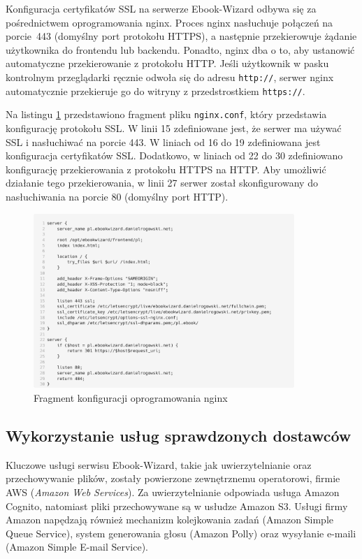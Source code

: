 Konfiguracja certyfikatów SSL na serwerze Ebook-Wizard odbywa się za pośrednictwem oprogramowania nginx. Proces nginx nasłuchuje połączeń na porcie~443 (domyślny port protokołu HTTPS), a następnie przekierowuje żądanie użytkownika do frontendu lub backendu. Ponadto, nginx dba o to, aby ustanowić automatyczne przekierowanie z protokołu HTTP. Jeśli użytkownik w pasku kontrolnym przeglądarki ręcznie odwoła się do adresu \verb|http://|, serwer nginx automatycznie przekieruje go do witryny z przedstrostkiem \verb|https://|.

Na listingu \ref{listing:carbon_nginx} przedstawiono fragment pliku \verb|nginx.conf|, który przedstawia konfigurację protokołu SSL. W linii 15 zdefiniowane jest, że serwer ma używać SSL i nasłuchiwać na porcie 443. W liniach od 16 do 19 zdefiniowana jest konfiguracja certyfikatów SSL. Dodatkowo, w liniach od 22 do 30 zdefiniowano konfigurację przekierowania z protokołu HTTPS na HTTP. Aby umożliwić działanie tego przekierowania, w 
 linii 27 serwer został skonfigurowany do nasłuchiwania na porcie 80 (domyślny port HTTP). \cite{packt_nginx, https_http_in_action}

\begin{figure}[h]
    \centering
    \setlength{\fboxsep}{0pt}
    \setlength{\fboxrule}{0.4pt}
    \includegraphics[width=0.88\textwidth]{chap6/carbon_nginx.png}
    \caption{Fragment konfiguracji oprogramowania nginx}
    \label{listing:carbon_nginx}
\end{figure}

\subsection{Wykorzystanie usług sprawdzonych dostawców}

Kluczowe usługi serwisu Ebook-Wizard, takie jak uwierzytelnianie oraz przechowywanie plików, zostały powierzone zewnętrznemu operatorowi, firmie AWS (\textit{Amazon Web Services}). Za uwierzytelnianie odpowiada usługa Amazon Cognito, natomiast pliki przechowywane są w usłudze Amazon S3. Usługi firmy Amazon napędzają również mechanizm kolejkowania zadań (Amazon Simple Queue Service), system generowania głosu (Amazon Polly) oraz wysyłanie e-maili (Amazon Simple E-mail Service).

